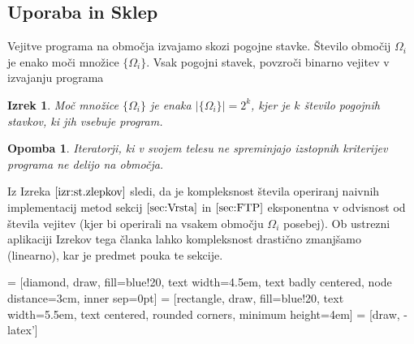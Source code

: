 \documentclass{article}
\newtheorem{izrek}{Izrek}[section]
\newtheorem{opomba}{Opomba}[section]
\begin{document}
\subsection{Uporaba in Sklep}

Vejitve programa na območja izvajamo skozi pogojne stavke. Število območij $\Omega_i$ je enako moči množice $\{\Omega_i\}$. Vsak pogojni stavek, povzroči binarno vejitev v izvajanju programa

\begin{izrek}\label{izr:st.zlepkov}
Moč množice $\{\Omega_i\}$ je enaka $\lvert\{\Omega_i \}\rvert=2^k$, kjer je $k$ število pogojnih stavkov, ki jih vsebuje program.
\end{izrek}
\begin{opomba}
Iteratorji, ki v svojem telesu ne spreminjajo izstopnih kriterijev programa ne delijo na območja.
\end{opomba}
Iz Izreka $\ref{izr:st.zlepkov}$ sledi, da je kompleksnost števila operiranj naivnih implementacij metod sekcij $\ref{sec:Vrsta}$ in $\ref{sec:FTP}$ eksponentna v odvisnost od števila vejitev (kjer bi operirali na vsakem območju $\Omega_i$ posebej). Ob ustrezni aplikaciji Izrekov tega članka lahko kompleksnost drastično zmanjšamo (linearno), kar je predmet pouka te sekcije.
\vspace{10px}

 = [diamond, draw, fill=blue!20, 
    text width=4.5em, text badly centered, node distance=3cm, inner sep=0pt]
 = [rectangle, draw, fill=blue!20, 
    text width=5.5em, text centered, rounded corners, minimum height=4em]
 = [draw, -latex']
\end{document}
